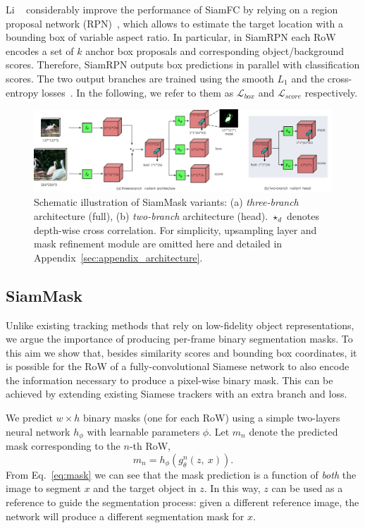 Li \etal~\cite{SiamRPN} considerably improve the performance of SiamFC by relying on a region proposal network (RPN)~\cite{ren2015faster, feichtenhofer2017detect}, which allows to estimate the target location with a bounding box of variable aspect ratio.
In particular, in SiamRPN each RoW encodes a set of $k$ anchor box proposals and corresponding object/background scores.
Therefore, SiamRPN outputs box predictions in parallel with classification scores.
The two output branches are trained using the smooth $L_{1}$ and the cross-entropy losses~\cite[Section 3.2]{SiamRPN}.
In the following, we refer to them as $\mathcal{L}_{box}$ and $\mathcal{L}_{score}$ respectively.

\begin{figure}
\begin{center}
\includegraphics[width=1.0 \textwidth]{img/32branch.pdf}
\end{center}
\caption{Schematic illustration of SiamMask variants: (a) \textit{three-branch} architecture (full), (b) \textit{two-branch} architecture (head).  $\star_d$ denotes depth-wise cross correlation. For simplicity, upsampling layer and mask refinement module are omitted here and detailed in Appendix~\ref{sec:appendix_architecture}.}
\label{fig:schematic}
\vspace{-0.2cm}
\end{figure}

\subsection{SiamMask}
\label{sec:siammask}
Unlike existing tracking methods that rely on low-fidelity object representations, we argue the importance of producing per-frame binary segmentation masks.
To this aim we show that, besides similarity scores and bounding box coordinates, it is possible for the RoW of a fully-convolutional Siamese network to also encode the information necessary to produce a pixel-wise binary mask.
This can be achieved by extending existing Siamese trackers with an extra branch and loss.

We predict $w{\times}h$ binary masks (one for each RoW) using a simple two-layers neural network $h_{\phi}$ with learnable parameters $\phi$.
Let $m_{n}$ denote the predicted mask corresponding to the $n$-th RoW,
\begin{equation}\label{eq:mask}
m_{n} = h_{\phi}(g_{\theta}^{n}(z,~x)).
\end{equation}
From Eq.~\ref{eq:mask} we can see that the mask prediction is a function of \emph{both} the image to segment $x$ and the target object in $z$.
In this way, $z$ can be used as a reference to guide the segmentation process:
given a different reference image, the network will produce a different segmentation mask for $x$.

